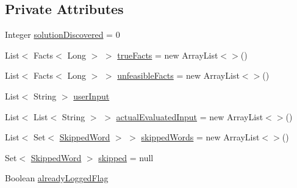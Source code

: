 \subsection*{Private Attributes}
\begin{DoxyCompactItemize}
\item 
Integer \hyperlink{classit_1_1emarolab_1_1cagg_1_1core_1_1evaluation_1_1inputFormatting_1_1ThreadedInputFormatter_1_1FactsSearcher_ad1bcdf1188af821529dcfb66851e7c5e}{solution\-Discovered} = 0
\item 
List$<$ Facts$<$ Long $>$ $>$ \hyperlink{classit_1_1emarolab_1_1cagg_1_1core_1_1evaluation_1_1inputFormatting_1_1ThreadedInputFormatter_1_1FactsSearcher_aac1c50fafd0d1ecbaf80674ffbb6104a}{true\-Facts} = new Array\-List$<$$>$()
\item 
List$<$ Facts$<$ Long $>$ $>$ \hyperlink{classit_1_1emarolab_1_1cagg_1_1core_1_1evaluation_1_1inputFormatting_1_1ThreadedInputFormatter_1_1FactsSearcher_adfd75c85dd66bbf7af0d1e2c690a1aab}{unfeasible\-Facts} = new Array\-List$<$$>$()
\item 
List$<$ String $>$ \hyperlink{classit_1_1emarolab_1_1cagg_1_1core_1_1evaluation_1_1inputFormatting_1_1ThreadedInputFormatter_1_1FactsSearcher_a4cdee8a1a302117f14597c0457b2af6c}{user\-Input}
\item 
List$<$ List$<$ String $>$ $>$ \hyperlink{classit_1_1emarolab_1_1cagg_1_1core_1_1evaluation_1_1inputFormatting_1_1ThreadedInputFormatter_1_1FactsSearcher_ad51b32c4f8bc966c042d51e5d1b4051b}{actual\-Evaluated\-Input} = new Array\-List$<$$>$()
\item 
List$<$ Set$<$ \hyperlink{classit_1_1emarolab_1_1cagg_1_1core_1_1evaluation_1_1inputFormatting_1_1ThreadedInputFormatter_1_1SkippedWord}{Skipped\-Word} $>$ $>$ \hyperlink{classit_1_1emarolab_1_1cagg_1_1core_1_1evaluation_1_1inputFormatting_1_1ThreadedInputFormatter_1_1FactsSearcher_a329a551c9f063cf71da456ac616a161f}{skipped\-Words} = new Array\-List$<$$>$()
\item 
Set$<$ \hyperlink{classit_1_1emarolab_1_1cagg_1_1core_1_1evaluation_1_1inputFormatting_1_1ThreadedInputFormatter_1_1SkippedWord}{Skipped\-Word} $>$ \hyperlink{classit_1_1emarolab_1_1cagg_1_1core_1_1evaluation_1_1inputFormatting_1_1ThreadedInputFormatter_1_1FactsSearcher_a887696fcd109fd3aabfe45a314677a97}{skipped} = null
\item 
Boolean \hyperlink{classit_1_1emarolab_1_1cagg_1_1core_1_1evaluation_1_1inputFormatting_1_1ThreadedInputFormatter_1_1FactsSearcher_adf952e7a83be82708faee56d72d0f733}{already\-Logged\-Flag}
\end{DoxyCompactItemize}

